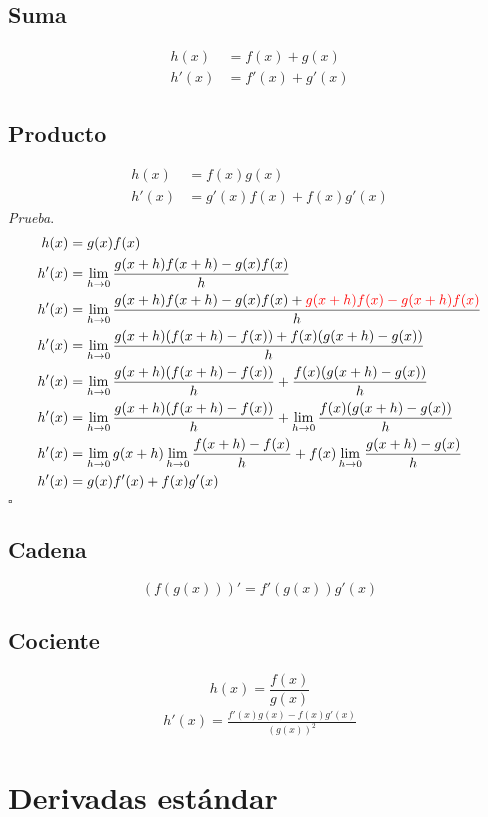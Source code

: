 \documentclass[spanish,12pt]{article}
\begin{document}
\subsection{Suma}
    \begin{align*}
        h(x)&=f(x)+g(x)\\
        h'(x)&=f'(x)+g'(x)
    \end{align*}
\subsection{Producto}
\begin{align*}
    h(x)&=f(x)g(x)\\
    h'(x)&=g'(x)f(x)+f(x)g'(x)
\end{align*}
\textit{Prueba}.
\begin{align*}
    h(x)&=g(x)f(x)\\
    h'(x)&=\lim_{h\to0}\frac{g(x+h)f(x+h)-g(x)f(x)}{h}\\
    h'(x)&=\lim_{h\to0}\frac{g(x+h)f(x+h)-g(x)f(x)+{\color{red}g(x+h)f(x)-g(x+h)f(x)}}{h}\\
    h'(x)&=\lim_{h\to0}\frac{g(x+h)(f(x+h)-f(x))+f(x)(g(x+h)-g(x))}{h}\\
    h'(x)&=\lim_{h\to0}\frac{g(x+h)(f(x+h)-f(x))}{h}+\frac{f(x)(g(x+h)-g(x))}{h}\\
    h'(x)&=\lim_{h\to0}\frac{g(x+h)(f(x+h)-f(x))}{h}+\lim_{h\to0}\frac{f(x)(g(x+h)-g(x))}{h}\\
    h'(x)&=\lim_{h\to0}g(x+h)\lim_{h\to0}\frac{f(x+h)-f(x)}{h}+f(x)\lim_{h\to0}\frac{g(x+h)-g(x)}{h}\\
    h'(x)&=g(x)f'(x)+f(x)g'(x)
\end{align*}
\hfill $\square$
\subsection{Cadena}
$$(f(g(x)))'=f'(g(x))g'(x)$$
\subsection{Cociente}
$$h(x)=\frac{f(x)}{g(x)}$$
\begin{align}
    h'(x)=\frac{f'(x)g(x)-f(x)g'(x)}{(g(x))^2}\label{eq:1}
\end{align}
\newpage
\section{Derivadas estándar}
\end{document}
